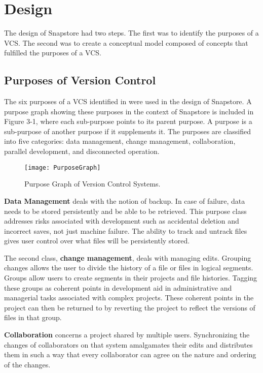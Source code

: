 \chapter{Design}

The design of Snapstore had two steps. The first was to identify the purposes of a VCS. The second was to create a conceptual model composed of concepts that fulfilled the purposes of a VCS.

\section{Purposes of Version Control}

The six purposes of a VCS identified in \cite{RossoJackson} were used in the design of Snapstore. A purpose graph showing these purposes in the context of Snapstore is included in Figure 3-1, where each sub-purpose points to its parent purpose. A purpose is a sub-purpose of another purpose if it supplements it. The purposes are classified into five categories: data management, change management, collaboration, parallel development, and disconnected operation.

\begin{figure}
\texttt{[image: PurposeGraph]}
\caption{Purpose Graph of Version Control Systems.}
\label{arm:fig1}
\end{figure}

\textbf{Data Management} deals with the notion of backup. In case of failure, data needs to be stored persistently and be able to be retrieved. This purpose class addresses risks associated with development such as accidental deletion and incorrect saves, not just machine failure. The ability to track and untrack files gives user control over what files will be persistently stored.

The second class, \textbf{change management}, deals with managing edits. Grouping changes allows the user to divide the history of a file or files in logical segments. Groups allow users to create segments in their projects and file histories. Tagging these groups as coherent points in development aid in administrative and managerial tasks associated with complex projects. These coherent points in the project can then be returned to by reverting the project to reflect the versions of files in that group.

\textbf{Collaboration} concerns a project shared by multiple users. Synchronizing the changes of collaborators on that system amalgamates their edits and distributes them in such a way that every collaborator can agree on the nature and ordering of the changes.

